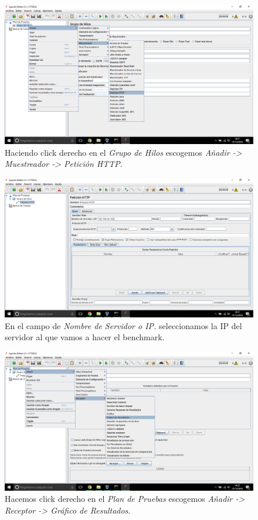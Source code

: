 \begin{figure}[H]
	\centering
	\includegraphics[scale=0.3]{jmeter3.png}
	\caption{Haciendo click derecho en el \textit{Grupo de Hilos} escogemos \textit{Añadir -> Muestreador -> Petición HTTP}.}
\end{figure}
\begin{figure}[H]
	\centering
	\includegraphics[scale=0.3]{jmeter4.png}
	\caption{En el campo de \textit{Nombre de Servidor o IP.} seleccionamos la IP del servidor al que vamos a hacer el benchmark.}
\end{figure}
\begin{figure}[H]
	\centering
	\includegraphics[scale=0.3]{jmeter5.png}
	\caption{Hacemos click derecho en el \textit{Plan de Pruebas} escogemos \textit{Añadir -> Receptor -> Gráfico de Resultados}.}
\end{figure}
